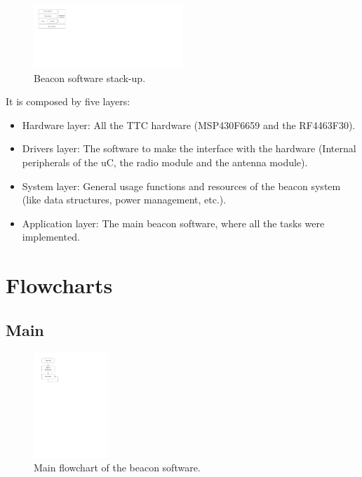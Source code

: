 \begin{figure}[!h]
	\begin{center}
		\includegraphics[width=0.5\textwidth]{figures/beacon_software_layers.pdf}
		\caption{Beacon software stack-up.}
		\label{fig:beacon-software-layers}
	\end{center}
\end{figure}

It is composed by five layers:

\begin{itemize}
    \item Hardware layer: All the TTC hardware (MSP430F6659 and the RF4463F30).
    \item Drivers layer: The software to make the interface with the hardware (Internal peripherals of the uC, the radio module and the antenna module).
    \item System layer: General usage functions and resources of the beacon system (like data structures, power management, etc.).
    \item Application layer: The main beacon software, where all the tasks were implemented.
\end{itemize}

\section{Flowcharts}

\subsection{Main}

\begin{figure}[!h]
	\begin{center}
		\includegraphics[width=0.25\textwidth]{figures/beacon_main_flowchart.pdf}
		\caption{Main flowchart of the beacon software.}
		\label{fig:beacon-main-flowchart}
	\end{center}
\end{figure}

